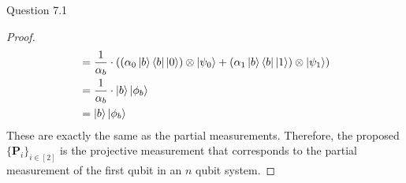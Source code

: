 \begin{solution}{Question 7.1}
\begin{proof}
\begin{equation}
\begin{split}
                              &= \frac{1}{\alpha_b}\cdot\left(\left(\alpha_0\ket{b}\bra{b}\ket{0}\right)\otimes\ket{\psi_0} + \left(\alpha_1\ket{b}\bra{b}\ket{1}\right)\otimes\ket{\psi_1}\right)\\
                              &= \frac{1}{\alpha_b}\cdot\ket{b}\ket{\phi_b}\\
                              &= \ket{b}\ket{\phi_b}
            \end{split}
        \end{equation}
        These are exactly the same as the partial measurements. Therefore, the proposed $\{\mathbf{P}_i\}_{i\in [2]}$ is the projective measurement that corresponds to the partial measurement of the first qubit in an $n$ qubit system.
    \end{proof}
\end{solution}
